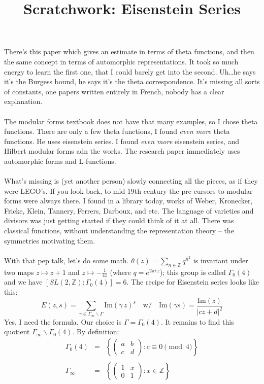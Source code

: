 \documentclass[12pt]{article}
\title{Scratchwork: Eisenstein Series}
\date{}
\begin{document}

\sffamily

\maketitle

\noindent There's this paper which gives an estimate in terms of theta functions, and then the same concept in terms of automorphic representations.  It took so much energy to learn the first one, that I could barely get into the second.  Uh\dots he says it's the Burgess bound, he says it's the theta correspondence.  It's missing all sorts of constants, one papers written entirely in French, nobody has a clear explanation.  \\ \\
The modular forms textbook does not have that many examples, so I chose theta functions. There are only a few theta functions, I found \textit{even more} theta functions. He uses eisenstein series.  I found \textit{even more} eisenstein series, and Hilbert modular forms adn the works.  The research paper immediately uses automorphic forms and L-functions.   \\ \\
What's missing is (yet another person) slowly connecting all the pieces, as if they were LEGO's.  If you look back, to mid 19th century the pre-cursors to modular forms were always there. I found in a library today, works of Weber, Kronecker, Fricke, Klein, Tannery, Ferrers, Darboux, and etc. The language of varieties and divisors was just getting started if they could think of it at all.  There was classical functions, without understanding the representation theory -- the symmetries motivating them.  \\ \\
With that pep talk, let's do some math.  $\theta(z) = \sum_{n \in \mathbb{Z}} q^{n^2}$ is invariant under two maps $z \mapsto z + 1$ and $z \mapsto - \frac{1}{4z}$ (where $q = e^{2\pi i \, z }$); this group is called $\Gamma_0(4)$ and we have $[SL(2, \mathbb{Z}):\Gamma_0(4)] = 6$.  The recipe for Eisenstein series looks like this:
$$ E(z,s) = \sum_{\gamma \in \Gamma_\infty \backslash \Gamma} \mathrm{Im}(\gamma \, z)^s \quad\text{w/}\quad \mathrm{Im}(\gamma s) = \frac{\mathrm{Im}(z)}{|cz+d|^2}$$
Yes, I need the formula. Our choice is $\Gamma = \Gamma_0(4)$. It remains to find this quotient $\Gamma_\infty \backslash \Gamma_0(4)$.  By definition:
\begin{eqnarray*}
\Gamma_0(4) &=& \left\{ \left( \begin{array}{cc} a & b \\ c & d\end{array} \right): c \equiv 0 \pmod 4 \right\} \\ \\
\Gamma_\infty      &=& \left\{ \left( \begin{array}{cc} 1 & x \\ 0 & 1\end{array} \right): x \in \mathbb{Z} \right\} 
\end{eqnarray*}
\end{document}
